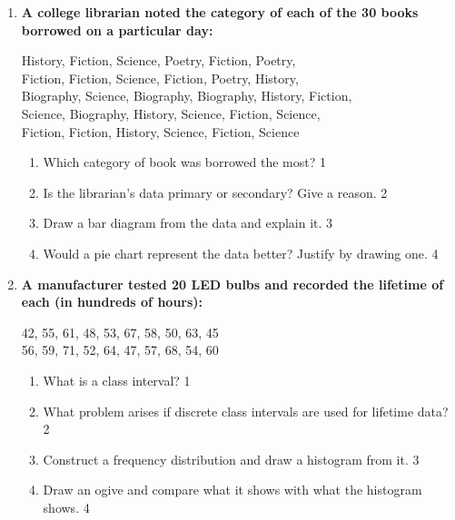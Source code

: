 \documentclass[12pt]{article}
\begin{document}
\begin{enumerate}
\item
\textbf{A college librarian noted the category of each of the 30 books borrowed on a particular day:}
\begin{center}
History, Fiction, Science, Poetry, Fiction, Poetry,\\
Fiction, Fiction, Science, Fiction, Poetry, History,\\
Biography, Science, Biography, Biography, History, Fiction,\\
Science, Biography, History, Science, Fiction, Science,\\
Fiction, Fiction, History, Science, Fiction, Science
\end{center}
\begin{enumerate}
  \item Which category of book was borrowed the most? \hfill 1
  \item Is the librarian's data primary or secondary? Give a reason. \hfill 2
  \item Draw a bar diagram from the data and explain it. \hfill 3
  \item Would a pie chart represent the data better? Justify by drawing one. \hfill 4
\end{enumerate}

\item
\textbf{A manufacturer tested 20 LED bulbs and recorded the lifetime of each (in hundreds of hours):}
\begin{center}
42, 55, 61, 48, 53, 67, 58, 50, 63, 45 \\
56, 59, 71, 52, 64, 47, 57, 68, 54, 60
\end{center}
\begin{enumerate}
  \item What is a class interval? \hfill 1
  \item What problem arises if discrete class intervals are used for lifetime data? \hfill 2
  \item Construct a frequency distribution and draw a histogram from it. \hfill 3
  \item Draw an ogive and compare what it shows with what the histogram shows. \hfill 4
\end{enumerate}


\end{enumerate}
\end{document}
